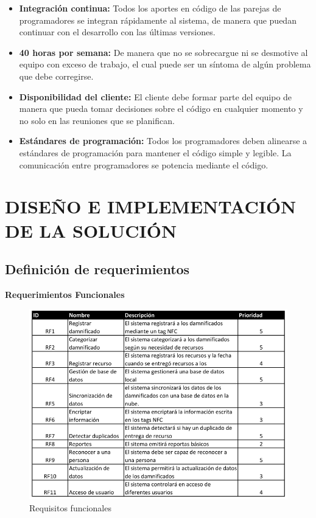 \documentclass[11pt,openany]{book}
\begin{document}
\begin{itemize}
			\item \textbf{Integración continua: }Todos los aportes en código de las parejas de programadores se integran rápidamente al sistema, de manera que puedan continuar con el desarrollo con las últimas versiones.
			\item \textbf{40 horas por semana: }De manera que no se sobrecargue ni se desmotive al equipo con exceso de trabajo, el cual puede ser un síntoma de algún problema que debe corregirse.
			\item \textbf{Disponibilidad del cliente: }El cliente debe formar parte del equipo de manera que pueda tomar decisiones sobre el código en cualquier momento y no solo en las reuniones que se planifican.
			\item \textbf{Estándares de programación: }Todos los programadores deben alinearse a estándares de programación para mantener el código simple y legible. La comunicación entre programadores se potencia mediante el código.
		\end{itemize}

	\chapter{DISEÑO E IMPLEMENTACIÓN DE LA SOLUCIÓN}
	\newpage

	\section{Definición de requerimientos}
	\textbf{Requerimientos Funcionales}

	\begin{figure}[htb]
			\centering
			\includegraphics[width=1\textwidth]{imagenes/requisitos_funcionales.PNG}
			\caption{Requisitos funcionales}
			\label{Requisitos_Funcionales}
	\end{figure}
\end{document}
